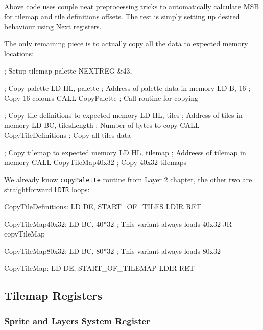 Above code uses couple neat preprocessing tricks to automatically calculate MSB for tilemap and tile definitions offsets. The rest is simply setting up desired behaviour using Next registers.

\pagebreak
The only remaining piece is to actually copy all the data to expected memory locations:

\begin{tcblisting}{}
	; Setup tilemap palette
	NEXTREG &43, %

	; Copy palette
	LD HL, palette               ; Address of palette data in memory
	LD B, 16                     ; Copy 16 colours
	CALL CopyPalette             ; Call routine for copying

	; Copy tile definitions to expected memory
	LD HL, tiles                 ; Address of tiles in memory
	LD BC, tilesLength           ; Number of bytes to copy
	CALL CopyTileDefinitions     ; Copy all tiles data

	; Copy tilemap to expected memory
	LD HL, tilemap               ; Addreess of tilemap in memory
	CALL CopyTileMap40x32        ; Copy 40x32 tilemaps
\end{tcblisting}

We already know {\tt copyPalette} routine from Layer 2 chapter, the other two are straightforward {\tt LDIR} loops:

\begin{tcblisting}{}
CopyTileDefinitions:
	LD DE, START_OF_TILES
	LDIR
	RET

CopyTileMap40x32:
	LD BC, 40*32		; This variant always loads 40x32
	JR copyTileMap

CopyTileMap80x32:
	LD BC, 80*32		; This variant always loads 80x32

CopyTileMap:
	LD DE, START_OF_TILEMAP
	LDIR
	RET
\end{tcblisting}


\pagebreak
\subsection{Tilemap Registers}
\label{zx_next_tilemap_registers}

\subsubsection{Sprite and Layers System Register }

